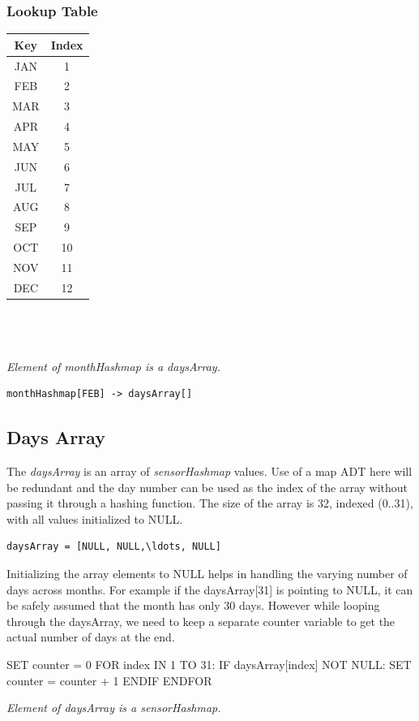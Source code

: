 \documentclass[12pt]{article}
\begin{document}
\subsubsection{Lookup Table}
\begin{tabular}{| c | c |}
	\hline
	Key & Index \\
	\hline
	JAN & 1 \\
	\hline
	FEB & 2 \\
	\hline
	MAR & 3 \\
	\hline
	APR & 4 \\
	\hline
	MAY & 5 \\
	\hline
	JUN & 6 \\
	\hline
	JUL & 7 \\
	\hline
	AUG & 8 \\
	\hline
	SEP & 9 \\
	\hline
	OCT & 10 \\
	\hline
	NOV & 11 \\
	\hline
	DEC & 12 \\
	\hline
\end{tabular}
\\ \\ \\
{\em Element of monthHashmap is a daysArray.}
\begin{lstlisting}
monthHashmap[FEB] -> daysArray[]
\end{lstlisting}

\subsection{Days Array}
The {\em daysArray} is an array of {\em sensorHashmap} values. Use of a map ADT here will be redundant and the day number can be used as the index of the array without passing it through a hashing function. The size of the array is 32, indexed (0..31), with all values initialized to NULL.
\begin{lstlisting}
daysArray = [NULL, NULL,\ldots, NULL]
\end{lstlisting}
Initializing the array elements to NULL helps in handling the varying number of days across months. For example if the daysArray[31] is pointing to NULL, it can be safely assumed that the month has only 30 days. However while looping through the daysArray, we need to keep a separate counter variable to get the actual number of days at the end.
\begin{algorithm}[caption={Count number of days in a given daysArray.}, label={subalgo1}]
SET counter = 0
FOR index IN 1 TO 31:
IF daysArray[index] NOT NULL:
SET counter = counter + 1
ENDIF
ENDFOR	
\end{algorithm}
{\em Element of daysArray is a sensorHashmap.}
\end{document}
